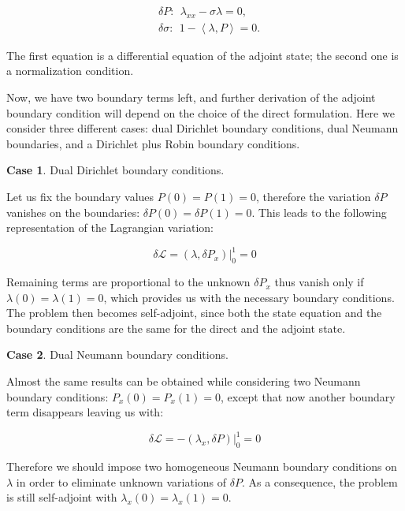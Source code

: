 \begin{subequations}
\begin{align}
    & \delta P: \ \  \lambda_{xx} - \sigma \lambda = 0, \\
    \label{eq:HelmAdjNormCond}
    & \delta \sigma: \ \ 1 - \left<\lambda, P \right> = 0.
\end{align}
\end{subequations}

The first equation is a differential equation of the adjoint state; the second one is a normalization condition.

Now, we have two boundary terms left, and further derivation of the adjoint boundary condition will depend on the choice of the direct formulation. Here we consider three different cases: dual Dirichlet boundary conditions, dual Neumann boundaries, and a Dirichlet plus Robin boundary conditions.

\textbf{Case 1}. Dual Dirichlet boundary conditions.

Let us fix the boundary values $P(0) = P(1) = 0$, therefore the variation $\delta P$ vanishes on the boundaries: $\delta P(0) = \delta P(1) = 0$. This leads to the following representation of the Lagrangian variation:

\begin{equation}
    \delta \mathcal{L} = \left( \lambda , \delta P_x \right) \rvert^1_0 = 0
\end{equation}

Remaining terms are proportional to the unknown $\delta P_x$ thus vanish only if $\lambda(0) = \lambda(1) = 0$, which provides us with the necessary boundary conditions. The problem then becomes self-adjoint, since both the state equation and the boundary conditions are the same for the direct and the adjoint state.

\textbf{Case 2}. Dual Neumann boundary conditions.

Almost the same results can be obtained while considering two Neumann boundary conditions: $P_x(0) = P_x(1) = 0$, except that now another boundary term disappears leaving us with:

\begin{equation}
    \delta \mathcal{L} = -\left( \lambda_x , \delta P \right) \rvert^1_0 = 0
\end{equation}

Therefore we should impose two homogeneous Neumann boundary conditions on $\lambda$ in order to eliminate unknown variations of $\delta P$. As a consequence, the problem is still self-adjoint with $\lambda_x(0) = \lambda_x(1) = 0$.

